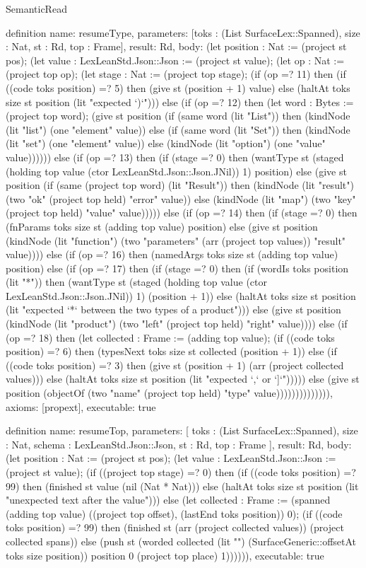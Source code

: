 \begin{lexlean}{SemanticRead}
\begin{semanticmodule}
definition{
  name: resumeType,
  parameters: [toks : (List SurfaceLex::Spanned), size : Nat, st : Rd, top : Frame],
  result: Rd,
  body: (let position : Nat := (project st pos); (let value : LexLeanStd.Json::Json := (project st value); (let op : Nat := (project top op); (let stage : Nat := (project top stage); (if (op =? 11) then (if ((code toks position) =? 5) then (give st (position + 1) value) else (haltAt toks size st position (lit "expected `)`"))) else (if (op =? 12) then (let word : Bytes := (project top word); (give st position (if (same word (lit "List")) then (kindNode (lit "list") (one "element" value)) else (if (same word (lit "Set")) then (kindNode (lit "set") (one "element" value)) else (kindNode (lit "option") (one "value" value)))))) else (if (op =? 13) then (if (stage =? 0) then (wantType st (staged (holding top value (ctor LexLeanStd.Json::Json.JNil)) 1) position) else (give st position (if (same (project top word) (lit "Result")) then (kindNode (lit "result") (two "ok" (project top held) "error" value)) else (kindNode (lit "map") (two "key" (project top held) "value" value))))) else (if (op =? 14) then (if (stage =? 0) then (fnParams toks size st (adding top value) position) else (give st position (kindNode (lit "function") (two "parameters" (arr (project top values)) "result" value)))) else (if (op =? 16) then (namedArgs toks size st (adding top value) position) else (if (op =? 17) then (if (stage =? 0) then (if (wordIs toks position (lit "*")) then (wantType st (staged (holding top value (ctor LexLeanStd.Json::Json.JNil)) 1) (position + 1)) else (haltAt toks size st position (lit "expected `*` between the two types of a product"))) else (give st position (kindNode (lit "product") (two "left" (project top held) "right" value)))) else (if (op =? 18) then (let collected : Frame := (adding top value); (if ((code toks position) =? 6) then (typesNext toks size st collected (position + 1)) else (if ((code toks position) =? 3) then (give st (position + 1) (arr (project collected values))) else (haltAt toks size st position (lit "expected `,` or `]`"))))) else (give st position (objectOf (two "name" (project top held) "type" value)))))))))))))),
  axioms: [propext],
  executable: true
}

definition{
  name: resumeTop,
  parameters: [
    toks : (List SurfaceLex::Spanned),
    size : Nat,
    schema : LexLeanStd.Json::Json,
    st : Rd,
    top : Frame
  ],
  result: Rd,
  body: (let position : Nat := (project st pos); (let value : LexLeanStd.Json::Json := (project st value); (if ((project top stage) =? 0) then (if ((code toks position) =? 99) then (finished st value (nil (Nat * Nat))) else (haltAt toks size st position (lit "unexpected text after the value"))) else (let collected : Frame := (spanned (adding top value) ((project top offset), (lastEnd toks position)) 0); (if ((code toks position) =? 99) then (finished st (arr (project collected values)) (project collected spans)) else (push st (worded collected (lit "") (SurfaceGeneric::offsetAt toks size position)) position 0 (project top place) 1)))))),
  executable: true
}


\end{semanticmodule}
\end{lexlean}
